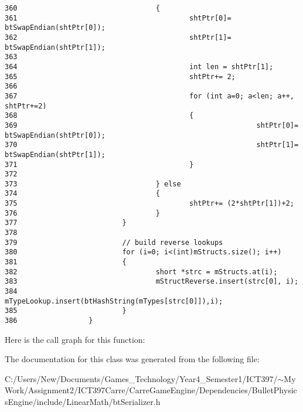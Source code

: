\begin{Code}
\begin{verbatim}
360                                 {
361                                         shtPtr[0]= btSwapEndian(shtPtr[0]);
362                                         shtPtr[1]= btSwapEndian(shtPtr[1]);
363 
364                                         int len = shtPtr[1];
365                                         shtPtr+= 2;
366 
367                                         for (int a=0; a<len; a++, shtPtr+=2)
368                                         {
369                                                         shtPtr[0]= btSwapEndian(shtPtr[0]);
370                                                         shtPtr[1]= btSwapEndian(shtPtr[1]);
371                                         }
372 
373                                 } else
374                                 {
375                                         shtPtr+= (2*shtPtr[1])+2;
376                                 }
377                         }
378 
379                         // build reverse lookups
380                         for (i=0; i<(int)mStructs.size(); i++)
381                         {
382                                 short *strc = mStructs.at(i);
383                                 mStructReverse.insert(strc[0], i);
384                                 mTypeLookup.insert(btHashString(mTypes[strc[0]]),i);
385                         }
386                 }
\end{verbatim}
\end{Code}




Here is the call graph for this function:

The documentation for this class was generated from the following file:\begin{CompactItemize}
\item 
C:/Users/New/Documents/Games\_\-Technology/Year4\_\-Semester1/ICT397/$\sim$My Work/Assignment2/ICT397Carre/CarreGameEngine/Dependencies/BulletPhysicsEngine/include/LinearMath/btSerializer.h\end{CompactItemize}
